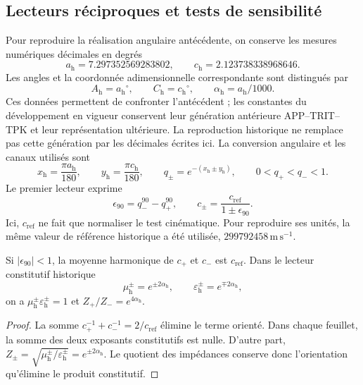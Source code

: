 \subsection{Lecteurs réciproques et tests de sensibilité}
\label{iii:hist:n6d}

Pour reproduire la réalisation angulaire antécédente, on conserve les mesures
numériques décimales en degrés
\[
 a_{\mathrm h}=7.297352569283802,\qquad
 c_{\mathrm h}=2.123738338968646.
\]
Les angles et la coordonnée adimensionnelle correspondante sont distingués par
\[
 A_{\mathrm h}=a_{\mathrm h}{}^\circ,\qquad
 C_{\mathrm h}=c_{\mathrm h}{}^\circ,\qquad
 \alpha_{\mathrm h}=a_{\mathrm h}/1000.
\]
Ces données permettent de confronter l’antécédent ; les constantes du développement
en vigueur conservent leur génération antérieure APP--TRIT--TPK et leur représentation
ultérieure. La reproduction historique ne remplace pas cette génération par les
décimales écrites ici. La conversion angulaire et les canaux utilisés sont
\[
 x_{\mathrm h}=\frac{\pi a_{\mathrm h}}{180},\qquad
 y_{\mathrm h}=\frac{\pi c_{\mathrm h}}{180},\qquad
 q_\pm=e^{-(x_{\mathrm h}\pm y_{\mathrm h})},
 \qquad0<q_+<q_-<1.
\]
Le premier lecteur exprime
\[
 \epsilon_{90}=q_-^{90}-q_+^{90},\qquad
 c_\pm=\frac{c_{\mathrm{ref}}}{1\pm\epsilon_{90}}.
\]
Ici, $c_{\mathrm{ref}}$ ne fait que normaliser le test cinématique. Pour reproduire
ses unités, la même valeur de référence historique a été utilisée,
$299792458\,\mathrm{m\,s^{-1}}$.

\begin{proposition}
\label{iii:hist:lectores}
Si $|\epsilon_{90}|<1$, la moyenne harmonique de $c_+$ et $c_-$ est
$c_{\mathrm{ref}}$. Dans le lecteur constitutif historique
\[
 \mu_{\mathrm h}^{\pm}=e^{\pm2\alpha_{\mathrm h}},\qquad
 \varepsilon_{\mathrm h}^{\pm}=e^{\mp2\alpha_{\mathrm h}},
\]
on a $\mu_{\mathrm h}^{\pm}\varepsilon_{\mathrm h}^{\pm}=1$ et
$Z_+/Z_-=e^{4\alpha_{\mathrm h}}$.
\end{proposition}
\begin{proof}
La somme $c_+^{-1}+c_-^{-1}=2/c_{\mathrm{ref}}$ élimine le terme orienté.
Dans chaque feuillet, la somme des deux exposants constitutifs est nulle.
D’autre part, $Z_\pm=\sqrt{\mu_{\mathrm h}^{\pm}/
\varepsilon_{\mathrm h}^{\pm}}=e^{\pm2\alpha_{\mathrm h}}$.
Le quotient des impédances conserve donc l’orientation qu’élimine
le produit constitutif.
\end{proof}

